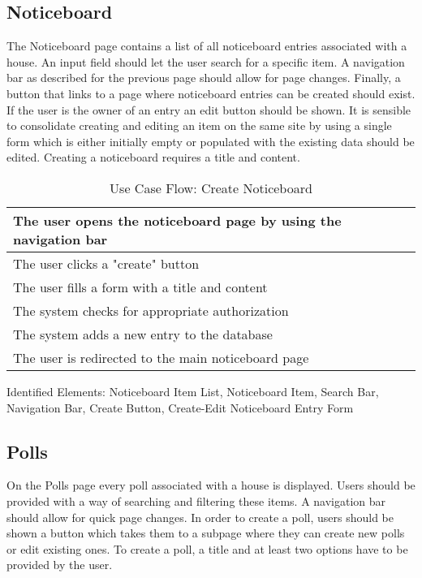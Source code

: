 \subsection{Noticeboard} \label{sub:noticeboardui}
The Noticeboard page contains a list of all noticeboard entries associated with a house. An input field should let the user search for a specific item. A navigation bar as described for the previous page should allow for page changes. Finally, a button that links to a page where noticeboard entries can be created should exist. If the user is the owner of an entry an edit button should be shown. It is sensible to consolidate creating and editing an item on the same site by using a single form which is either initially empty or populated with the existing data should be edited. Creating a noticeboard requires a title and content. \newline

\begin{table}[H]
    \begin{tabularx}{\linewidth}{|X|}
      \hline
       The user opens the noticeboard page by using the navigation bar \\
       \hline
       The user clicks a "create" button \\
       \hline
       The user fills a form with a title and content \\
       \hline
       The system checks for appropriate authorization \\
       \hline
       The system adds a new entry to the database \\
       \hline
       The user is redirected to the main noticeboard page \\
       \hline 
    \end{tabularx}
    \caption{Use Case Flow: Create Noticeboard}
    \label{usecase:createnoticeboard}
  \end{table}
  
Identified Elements: Noticeboard Item List, Noticeboard Item, Search Bar, Navigation Bar, Create Button, Create-Edit Noticeboard Entry Form

\subsection{Polls}
On the Polls page every poll associated with a house is displayed. Users should be provided with a way of searching and filtering these items. A navigation bar should allow for quick page changes. In order to create a poll, users should be shown a button which takes them to a subpage where they can create new polls or edit existing ones. To create a poll, a title and at least two options have to be provided by the user.


